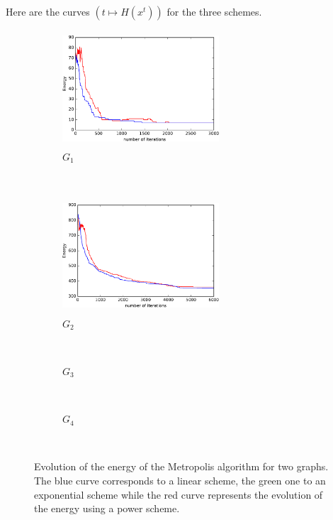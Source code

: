 \documentclass[a4paper]{article}
\begin{document}
Here are the curves $(t \mapsto H(x^t))$ for the three schemes. 
\begin{figure}[H]
    \centering
    \begin{subfigure}[b]{0.45\textwidth}
        \includegraphics[width=2.3in, height = 1.7in]{H_G1_cropped.pdf}
        \caption{$G_1$}
        \label{fig:g1}
    \end{subfigure}
    ~ %
    \begin{subfigure}[b]{0.45\textwidth}
        \includegraphics[width=2.3in, height=1.7in]{H_G2_cropped.pdf}
        \caption{$G_2$}
        \label{fig:g2}
    \end{subfigure}
    ~ %
    
    \begin{subfigure}[b]{0.45\textwidth}
        \centering{}
        \caption{$G_3$}
        \label{fig:g3}
    \end{subfigure}
    ~ %
    \begin{subfigure}[b]{0.45\textwidth}
        \centering{}
        \caption{$G_4$}
        \label{fig:g4}
    \end{subfigure}
    ~ %
    \caption{Evolution of the energy of the Metropolis algorithm for two graphs. The blue curve corresponds to a linear scheme, the green one to an exponential scheme while the red curve represents the evolution of the energy using a power scheme.}
    \label{fig:comparison}
\end{figure}
\end{document}

